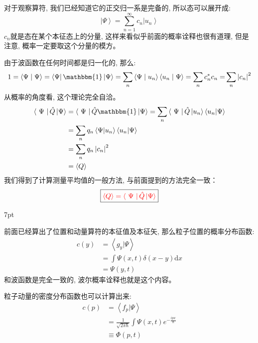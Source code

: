 \documentclass[a4paper,zihao=-4,linespread=1]{ctexrep}
\newenvironment{thinknote}{%
\def\FrameCommand{%
\hspace{1pt}%
{\color{BurlyWood}\vrule width 2pt}%
{\color{formalshade}\vrule width 4pt}%
\colorbox{formalshade}%
}%
\MakeFramed{\advance\hsize-\width\FrameRestore}%
\noindent\hspace{-4.55pt}%
\begin{adjustwidth}{}{7pt}%
\vspace{2pt}\vspace{2pt}%
}
{%
\vspace{2pt}\end{adjustwidth}\endMakeFramed%
}
\begin{document}
    对于观察算符, 我们已经知道它的正交归一系是完备的, 所以态可以展开成:
    \[\left | \Psi  \right \rangle =\sum\limits_{n=1}^{\infty } c_n\left | u_n \right \rangle \]
    $c_n$就是态在某个本征态上的分量, 这样来看似乎前面的概率诠释也很有道理, 但是注意, 概率一定要取这个分量的模方。

    由于波函数在任何时间都是归一化的, 那么:
    \begin{equation*}
        1 = \left\langle {\Psi }
    \mathrel{\left | {\vphantom {\Psi  \Psi }}
    \right. \kern-\nulldelimiterspace}
    {\Psi } \right\rangle  = \left\langle \Psi  \right|\mathbbm{1}\left| \Psi  \right\rangle  = \sum\limits_n {\left\langle {\Psi }
    \mathrel{\left | {\vphantom {\Psi  {{u_n}}}}
    \right. \kern-\nulldelimiterspace}
    {{{u_n}}} \right\rangle \left\langle {{{u_n}}}
    \mathrel{\left | {\vphantom {{{u_n}} \Psi }}
    \right. \kern-\nulldelimiterspace}
    {\Psi } \right\rangle }  = \sum\limits_n {c_n^*{c_n} = } \sum\limits_n {{{\left| {{c_n}} \right|}^2}} 
    \end{equation*}
    从概率的角度看, 这个理论完全自洽。
    \begin{align*}
        \left\langle \Psi \right| \hat{Q}  \left| \Psi  \right\rangle & = \left\langle \Psi \right| \hat{Q} \mathbbm{1} \left| \Psi  \right\rangle = \sum_{n} \left\langle \Psi \right| \hat{Q} \left| u_n  \right \rangle\left \langle u_n  | \Psi  \right \rangle \\ 
        &=\sum_{n} q_n\left\langle  \Psi  |u_n  \right\rangle\left \langle u_n  | \Psi  \right \rangle\\
        &=\sum_{n} q_n\left| c_n \right| ^2\\
        &=\left\langle Q \right\rangle 
    \end{align*}
    我们得到了计算测量平均值的一般方法, 与前面提到的方法完全一致：
    \begin{equation}
        \label{eq:3.14}
        \boxed{\color{red}\left\langle Q \right\rangle=\left\langle \Psi \right| \hat{Q}  \left| \Psi  \right\rangle}
    \end{equation}
    \begin{thinknote}
        \setlength\parindent{2em}前面已经算出了位置和动量算符的本征值及本征矢, 那么粒子位置的概率分布函数:
        \begin{align*}
            c\left ( y \right ) & = \left \langle g_y| \Psi  \right \rangle \\& = \int \Psi \left ( x,t \right ) \delta(x-y)\mathrm{d}x
            \\&=\Psi \left ( y,t \right ) 
        \end{align*}
        和波函数是完全一致的, 波尔概率诠释也就是这个内容。

        \setlength\parindent{2em}粒子动量的密度分布函数也可以计算出来:
        \begin{align*}
            c\left ( p \right ) & = \left \langle f_p  | \Psi  \right \rangle \\ & = \frac{1}{\sqrt{2\pi\hbar} } \int  \Psi(x,t)e^{-\frac{ipx}{\hbar } }\\
            &\equiv \Phi(p,t)
        \end{align*}
    \end{thinknote}
\end{document}
